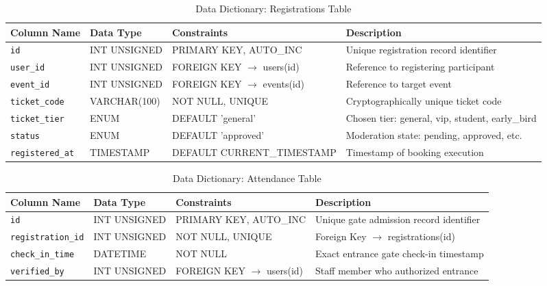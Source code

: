 \documentclass[11pt,a4paper]{report}
\begin{document}
\begin{table}[H]
\centering
\fontsize{8.5}{11}\selectfont
\renewcommand{\arraystretch}{1.3}
\setlength{\tabcolsep}{4pt}
\caption{Data Dictionary: Registrations Table}
\label{tab:dict_registrations}
\begin{tabularx}{\textwidth}{|p{}|p{}|p{}|X|}
\hline
\rowcolor{TCSBlue}
\color{white}\bfseries Column Name & 
\color{white}\bfseries Data Type & 
\color{white}\bfseries Constraints & 
\color{white}\bfseries Description \\\hline

\texttt{id} & INT UNSIGNED & PRIMARY KEY, AUTO\_INC & Unique registration record identifier \\\hline
\texttt{user\_id} & INT UNSIGNED & FOREIGN KEY $\to$ users(id) & Reference to registering participant \\\hline
\texttt{event\_id} & INT UNSIGNED & FOREIGN KEY $\to$ events(id) & Reference to target event \\\hline
\texttt{ticket\_code} & VARCHAR(100) & NOT NULL, UNIQUE & Cryptographically unique ticket code \\\hline
\texttt{ticket\_tier} & ENUM & DEFAULT 'general' & Chosen tier: general, vip, student, early\_bird \\\hline
\texttt{status} & ENUM & DEFAULT 'approved' & Moderation state: pending, approved, etc. \\\hline
\texttt{registered\_at} & TIMESTAMP & DEFAULT CURRENT\_TIMESTAMP & Timestamp of booking execution \\\hline
\end{tabularx}
\end{table}

\begin{table}[H]
\centering
\fontsize{8.5}{11}\selectfont
\renewcommand{\arraystretch}{1.3}
\setlength{\tabcolsep}{4pt}
\caption{Data Dictionary: Attendance Table}
\label{tab:dict_attendance}
\begin{tabularx}{\textwidth}{|p{}|p{}|p{}|X|}
\hline
\rowcolor{TCSBlue}
\color{white}\bfseries Column Name & 
\color{white}\bfseries Data Type & 
\color{white}\bfseries Constraints & 
\color{white}\bfseries Description \\\hline

\texttt{id} & INT UNSIGNED & PRIMARY KEY, AUTO\_INC & Unique gate admission record identifier \\\hline
\texttt{registration\_id} & INT UNSIGNED & NOT NULL, UNIQUE & Foreign Key $\to$ registrations(id) \\\hline
\texttt{check\_in\_time} & DATETIME & NOT NULL & Exact entrance gate check-in timestamp \\\hline
\texttt{verified\_by} & INT UNSIGNED & FOREIGN KEY $\to$ users(id) & Staff member who authorized entrance \\\hline
\end{tabularx}
\end{table}
\end{document}

